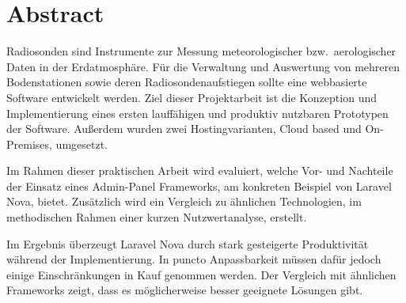 \newpage


\section*{Abstract}
Radiosonden sind Instrumente zur Messung meteorologischer bzw.\ aerologischer Daten in der Erdatmosphäre.
Für die Verwaltung und Auswertung von mehreren Bodenstationen sowie deren Radiosondenaufstiegen sollte eine webbasierte Software entwickelt werden.
Ziel dieser Projektarbeit ist die Konzeption und Implementierung eines ersten lauffähigen und produktiv nutzbaren Prototypen der Software.
Außerdem wurden zwei Hostingvarianten, Cloud based und On-Premises, umgesetzt.

Im Rahmen dieser praktischen Arbeit wird evaluiert, welche Vor- und Nachteile der Einsatz eines Admin-Panel Frameworks, am konkreten Beispiel von Laravel Nova, bietet.
Zusätzlich wird ein Vergleich zu ähnlichen Technologien, im methodischen Rahmen einer kurzen Nutzwertanalyse, erstellt.

Im Ergebnis überzeugt Laravel Nova durch stark gesteigerte Produktivität während der Implementierung.
In puncto Anpassbarkeit müssen dafür jedoch einige Einschränkungen in Kauf genommen werden.
Der Vergleich mit ähnlichen Frameworks zeigt, dass es möglicherweise besser geeignete Lösungen gibt.
